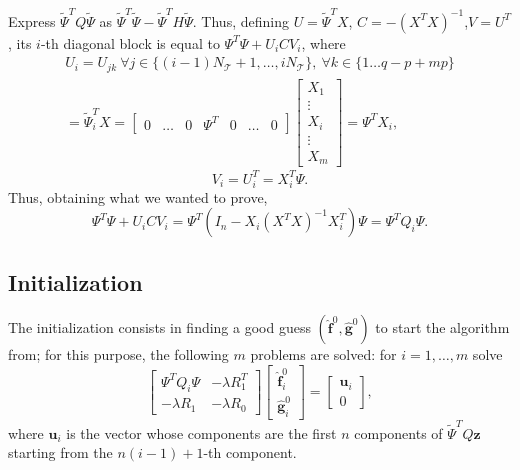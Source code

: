 Express $\tilde{\Psi}^TQ\tilde{\Psi}$ as
$\tilde{\Psi}^T\tilde{\Psi}-\tilde{\Psi}^TH\tilde{\Psi}$. Thus, defining $U =
	\tilde{\Psi}^TX$, $C = -\left(X^TX\right)^{-1}$,$V =U^T$, its $i$-th diagonal
block is equal to $\Psi^T\Psi + U_iCV_i $, where
\begin{equation}
	\begin{split}
		U_i = U_{jk} \ \forall j \in  \{\left(i-1\right)N_\mathcal{T}+1, \dots,
		iN_\mathcal{T}\},\ \forall k \in \{1 \dots q-p + mp\}\\
		= \tilde{\Psi}^T_iX =
		\begin{bmatrix}
			0 & \dots & 0 & \Psi^T & 0 & \dots & 0
		\end{bmatrix}
		\begin{bmatrix}
			X_1    \\
			\vdots \\
			X_i    \\
			\vdots \\
			X_m
		\end{bmatrix}
		= \Psi^T X_i,
	\end{split}
\end{equation}
\begin{equation}
	V_i = U_i^T = X^T_i\Psi.
\end{equation}
Thus, obtaining what we wanted to prove,
\begin{equation}
	\Psi^T\Psi +  U_iCV_i = \Psi^T \left( I_n-X_i\left(X^TX\right)^{-1}X_i^T \right) \Psi = \Psi^T Q_i \Psi.
\end{equation}

\subsection{Initialization}
The initialization consists in finding a good guess
$(\hat{\bm{f}}^0,\hat{\bm{g}}^0)$ to start the algorithm from; for this
purpose, the following $m$ problems are solved: for $i = 1, \dots, m$ solve
\begin{equation}
	\begin{bmatrix}
		\Psi^TQ_i\Psi & -\lambda R_1^T \\
		-\lambda R_1  & -\lambda R_0
	\end{bmatrix}
	\begin{bmatrix}
		\hat{\bm{f}}_i^0 \\
		\hat{\bm{g}}_i^0
	\end{bmatrix}
	=
	\begin{bmatrix}
		\bm{u}_i \\
		0
	\end{bmatrix}
	,
\end{equation}
where $\bm{u}_i$ is the vector whose components are the first $n$
components of $\tilde{\Psi}^T Q\bm{z}$ starting from the $n(i-1) +1$-th
component.

